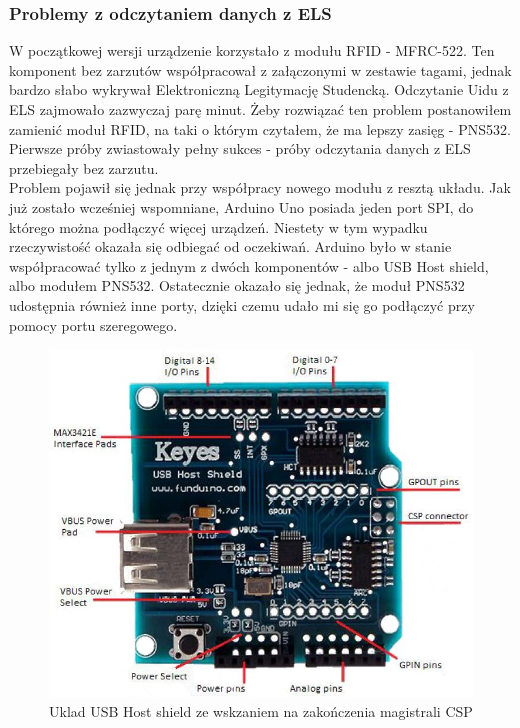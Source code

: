 \documentclass[declaration,shortabstract, mgr]{iithesis}
\begin{document}
\subsubsection{Problemy z odczytaniem danych z ELS}
\indent W początkowej wersji urządzenie korzystało z modułu RFID - MFRC-522. Ten komponent bez zarzutów współpracował z załączonymi w zestawie tagami, jednak bardzo słabo wykrywał Elektroniczną Legitymację Studencką. Odczytanie Uidu z ELS zajmowało zazwyczaj parę minut. Żeby rozwiązać ten problem postanowiłem zamienić moduł RFID, na taki o którym czytałem, że ma lepszy zasięg - PNS532. Pierwsze próby zwiastowały pełny sukces - próby odczytania danych z ELS przebiegały bez zarzutu. \\
\indent Problem pojawił się jednak przy współpracy nowego modułu z resztą układu. Jak już zostało wcześniej wspomniane, Arduino Uno posiada jeden port SPI, do którego można podłączyć więcej urządzeń. Niestety w tym wypadku rzeczywistość okazała się odbiegać od oczekiwań. Arduino było w stanie współpracować tylko z jednym z dwóch komponentów - albo USB Host shield, albo modułem PNS532. Ostatecznie okazało się jednak, że moduł PNS532 udostępnia również inne porty, dzięki czemu udało mi się go podłączyć przy pomocy portu szeregowego.
\begin{figure}[h]
\caption{Uklad USB Host shield ze wskzaniem na zakończenia magistrali CSP}
\centering
\includegraphics[scale=0.6]{usb_host_shield.jpg}
\end{figure}
\end{document}
